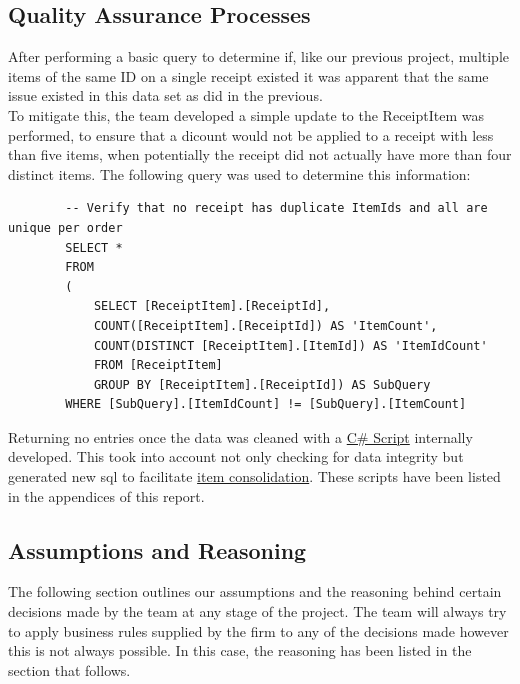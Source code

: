 \documentclass{article}
\begin{document}
        \subsection{Quality Assurance Processes}
        \label{sec:QAP}
        After performing a basic query to determine if, like our previous project, multiple 
        items of the same ID on a single receipt existed it was 
        apparent that the same issue existed in this data set as did in the previous.
        \\
        To mitigate this, the team developed a simple update to the 
        ReceiptItem was performed, to ensure that a dicount would not be applied to a receipt with 
        less than five items, when potentially the receipt did not 
        actually have more than four distinct items.
        The following query was used to determine this information:
        \begin{lstlisting}
        -- Verify that no receipt has duplicate ItemIds and all are unique per order
        SELECT *
        FROM
        (
            SELECT [ReceiptItem].[ReceiptId], 
            COUNT([ReceiptItem].[ReceiptId]) AS 'ItemCount',
            COUNT(DISTINCT [ReceiptItem].[ItemId]) AS 'ItemIdCount'
            FROM [ReceiptItem]
            GROUP BY [ReceiptItem].[ReceiptId]) AS SubQuery 
        WHERE [SubQuery].[ItemIdCount] != [SubQuery].[ItemCount]
        \end{lstlisting}

        Returning no entries once the data was cleaned with a 
        \hyperref[sec:sharpccleaning]{\color{blue}C\# Script} internally developed.
        This took into account not only checking for data integrity
        but generated new sql to facilitate \hyperref[sec:sharpcsqlgeneration]{\color{blue}item consolidation}.
        These scripts have been listed in the appendices of this report.

        \newpage

        \subsection{Assumptions and Reasoning}
        \label{sec:AR}
		The following section outlines our assumptions and the reasoning behind certain decisions
		made by the team at any stage of the project. The team will always try to apply business
		rules supplied by the firm to any of the decisions made however this is not always possible.
		In this case, the reasoning has been listed in the section that follows.        
        
\end{document}
